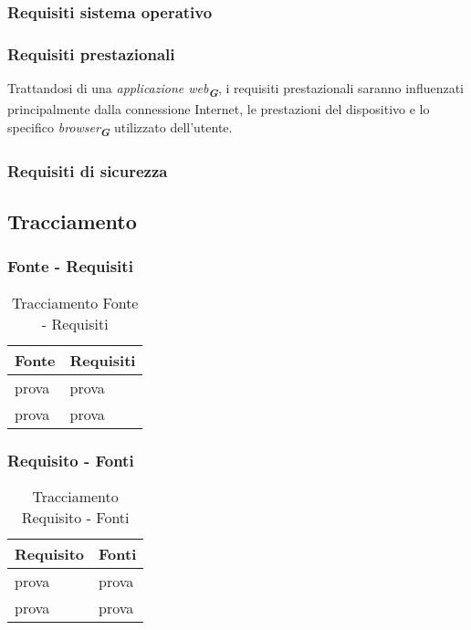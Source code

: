 \subsubsection{Requisiti sistema operativo}

\subsubsection{Requisiti prestazionali}
Trattandosi di una \emph{applicazione web}\textsubscript{\textit{\textbf{G}}}, i requisiti prestazionali saranno influenzati principalmente dalla connessione Internet, 
le prestazioni del dispositivo e lo specifico \emph{browser}\textsubscript{\textit{\textbf{G}}} utilizzato dell'utente.

\subsubsection{Requisiti di sicurezza}

\subsection{Tracciamento}

\subsubsection{Fonte - Requisiti}
\begin{table}[h!]
    \centering
    \renewcommand{\arraystretch}{1.6} %
    \begin{tabularx}{0.8\textwidth}{|>{\centering\arraybackslash}p{2.8cm}|>{\centering\arraybackslash}X|} \hline
    \rowcolor[HTML]{FFD700} 
    \textbf{Fonte} & \textbf{Requisiti} \\ \hline
    prova & prova \\ \hline
    prova & prova \\ \hline
    \end{tabularx}
    \caption{Tracciamento Fonte - Requisiti}
    \label{tab:Tracciamento_fonte_requisiti}
\end{table}


\subsubsection{Requisito - Fonti}
\begin{table}[h!]
    \centering
    \renewcommand{\arraystretch}{1.6} %
    \begin{tabularx}{0.8\textwidth}{|>{\centering\arraybackslash}p{2.8cm}|>{\centering\arraybackslash}X|} \hline
    \rowcolor[HTML]{FFD700} 
    \textbf{Requisito} & \textbf{Fonti} \\ \hline
    prova & prova \\ \hline
    prova & prova \\ \hline
    \end{tabularx}
    \caption{Tracciamento Requisito - Fonti}
    \label{tab:Tracciamento_requisiti_fonti}
\end{table}